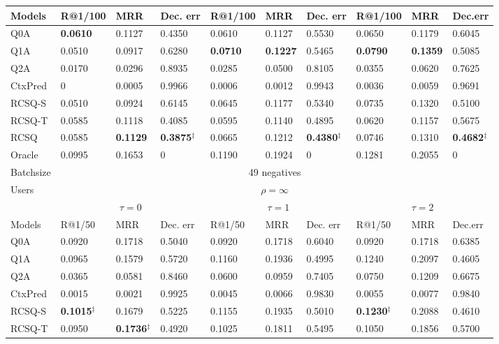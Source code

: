 \documentclass[format=acmsmall, review=False, screen=true]{acmart}
\begin{document}
\begin{table}
{\begin{tabular}{l|l|l|l|l|l|l|l|l|l}
Models  & R@1/100     & MRR    & Dec. err    & R@1/100     & MRR    & Dec. err & R@1/100 & MRR & Dec.err \\ \hline
Q0A     & \textbf{0.0610} & 0.1127 & 0.4350 &  0.0610 & 0.1127 & 0.5530 & 0.0650 & 0.1179 & 0.6045 \\ 
Q1A   & 0.0510 &  0.0917 & 0.6280   & \textbf{0.0710} & \textbf{0.1227} & 0.5465 & \textbf{0.0790} & \textbf{0.1359} & 0.5085 \\ 
Q2A     & 0.0170 & 0.0296 & 0.8935  & 0.0285 & 0.0500 & 0.8105 & 0.0355 & 0.0620 & 0.7625  \\ 
CtxPred & 0 & 0.0005 & 0.9966    & 0.0006 & 0.0012 & 0.9943 & 0.0036 &  0.0059 & 0.9691\\ \hline
RCSQ-S     & 0.0510 & 0.0924 & 0.6145 &0.0645 & 0.1177 & 0.5340 & 0.0735 & 0.1320& 0.5100 \\ 
RCSQ-T     & 0.0585 & 0.1118 & 0.4085 & 0.0595 & 0.1140 & 0.4895 & 0.0620 & 0.1157 &  0.5675 \\ 
RCSQ     & 0.0585 & \textbf{0.1129} & \textbf{0.3875}$^{\ddag}$ &  0.0665& 0.1212 & \textbf{0.4380}$^{\ddag}$ & 0.0746 & 0.1310 & \textbf{0.4682}$^{\ddag}$  \\ \hline
Oracle  & 0.0995 & 0.1653 & 0  & 0.1190 & 0.1924 & 0 & 0.1281  & 0.2055 & 0 \\ 
\hline\hline
Batchsize & \multicolumn{9}{c}{49 negatives} \\
\hline
\multirow{2}{*}{Users}  & \multicolumn{9}{c}{$\rho=\infty$} \\ 
\cline{2-10}  
   &  \multicolumn{3}{c|}{$\tau=0$} & \multicolumn{3}{c|}{$\tau=1$} & \multicolumn{3}{c}{$\tau=2$}\\ \hline
Models  & R@1/50      & MRR    & Dec. err    & R@1/50     & MRR    & Dec. err & R@1/50  & MRR & Dec.err \\ \hline
Q0A & 0.0920 & 0.1718 & 0.5040    & 0.0920 & 0.1718 & 0.6040 & 0.0920 & 0.1718 & 0.6385  \\ 
Q1A  & 0.0965  & 0.1579  & 0.5720 & 0.1160 & 0.1936 & 0.4995 & 0.1240 & 0.2097 & 0.4605 \\ 
Q2A     & 0.0365  &  0.0581   & 0.8460    & 0.0600 & 0.0959  & 0.7405 & 0.0750 & 0.1209 & 0.6675  \\ 
CtxPred &  0.0015   & 0.0021   & 0.9925  & 0.0045 & 0.0066 & 0.9830 & 0.0055 & 0.0077 & 0.9840  \\ \hline
RCSQ-S  &  \textbf{0.1015}$^{\ddag}$ & 0.1679 & 0.5225 & 0.1155 & 0.1935 & 0.5010 & \textbf{0.1230}$^{\ddag}$ & 0.2088 & 0.4610  \\ 
RCSQ-T  & 0.0950&  \textbf{0.1736}$^{\ddag}$ & 0.4920 & 0.1025 & 0.1811 & 0.5495 & 0.1050 & 0.1856 & 0.5700  \\

\end{tabular}}
\end{table}
\end{document}
